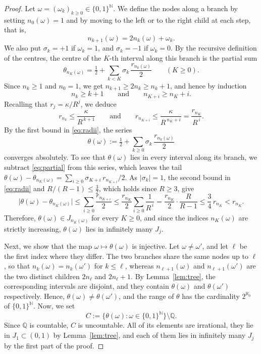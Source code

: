 \documentclass[10pt,a4paper]{amsart}
\newcommand{\N}{\mathbb{N}}
\newcommand{\Q}{\mathbb{Q}}
\begin{document}
\begin{proof}
Let $\omega=(\omega_k)_{k\ge0}\in\{0,1\}^{\N}$. We define the nodes along a branch by setting $n_0(\omega)=1$ and by moving to the left or to the right child at each step, that is,
\[
n_{k+1}(\omega)=2n_k(\omega)+\omega_k .
\]
We also put $\sigma_k=+1$ if $\omega_k=1$, and $\sigma_k=-1$ if $\omega_k=0$. By the recursive definition of the centres, the centre of the $K$-th interval along this branch is the partial sum
\begin{equation}\label{eq:partial}
\theta_{n_K(\omega)}=\tfrac12+\sum_{k<K}\sigma_k\,\frac{r_{n_k(\omega)}}2\qquad(K\ge0).
\end{equation}
Since $n_k\ge1$ and $n_0=1$, we get $n_{k+1}\ge2n_k\ge n_k+1$, and hence by induction
\[
n_k\ge k+1\qquad\text{and}\qquad n_{K+i}\ge n_K+i .
\]
Recalling that $r_j=\kappa/R^j$, we deduce
\begin{equation}\label{eq:radii}
r_{n_k}\le\frac{\kappa}{R^{\,k+1}}\qquad\text{and}\qquad r_{n_{K+i}}\le\frac{\kappa}{R^{\,n_K+i}}=\frac{r_{n_K}}{R^{\,i}}.
\end{equation}
By the first bound in \eqref{eq:radii}, the series
\[
\theta(\omega):=\tfrac12+\sum_{k\ge0}\sigma_k\,\frac{r_{n_k(\omega)}}2
\]
converges absolutely. To see that $\theta(\omega)$ lies in every interval along its branch, we subtract \eqref{eq:partial} from this series, which leaves the tail $\theta(\omega)-\theta_{n_K(\omega)}=\sum_{i\ge0}\sigma_{K+i}\,r_{n_{K+i}}/2$. As $|\sigma_k|=1$, the second bound in \eqref{eq:radii} and $R/(R-1)\le\tfrac32$, which holds since $R\ge3$, give
\[
\bigl|\theta(\omega)-\theta_{n_K(\omega)}\bigr|\le\sum_{i\ge0}\frac{r_{n_{K+i}}}2\le\frac{r_{n_K}}2\sum_{i\ge0}\frac1{R^{\,i}}=\frac{r_{n_K}}2\cdot\frac{R}{R-1}\le\frac34\,r_{n_K}<r_{n_K}.
\]
Therefore, $\theta(\omega)\in J_{n_K(\omega)}$ for every $K\ge0$, and since the indices $n_K(\omega)$ are strictly increasing, $\theta(\omega)$ lies in infinitely many $J_j$.

Next, we show that the map $\omega\mapsto\theta(\omega)$ is injective. Let $\omega\ne\omega'$, and let $\ell$ be the first index where they differ. The two branches share the same nodes up to $\ell$, so that $n_k(\omega)=n_k(\omega')$ for $k\le\ell$, whereas $n_{\ell+1}(\omega)$ and $n_{\ell+1}(\omega')$ are the two distinct children $2n_\ell$ and $2n_\ell+1$. By Lemma~\ref{lem:tree}, the corresponding intervals are disjoint, and they contain $\theta(\omega)$ and $\theta(\omega')$ respectively. Hence, $\theta(\omega)\ne\theta(\omega')$, and the range of $\theta$ has the cardinality $2^{\aleph_0}$ of $\{0,1\}^{\N}$. Now, we set
\[
C:=\bigl\{\theta(\omega):\omega\in\{0,1\}^{\N}\bigr\}\setminus\Q.
\]
Since $\Q$ is countable, $C$ is uncountable. All of its elements are irrational, they lie in $J_1\subset(0,1)$ by Lemma~\ref{lem:tree}, and each of them lies in infinitely many $J_j$ by the first part of the proof.
\end{proof}
\end{document}
